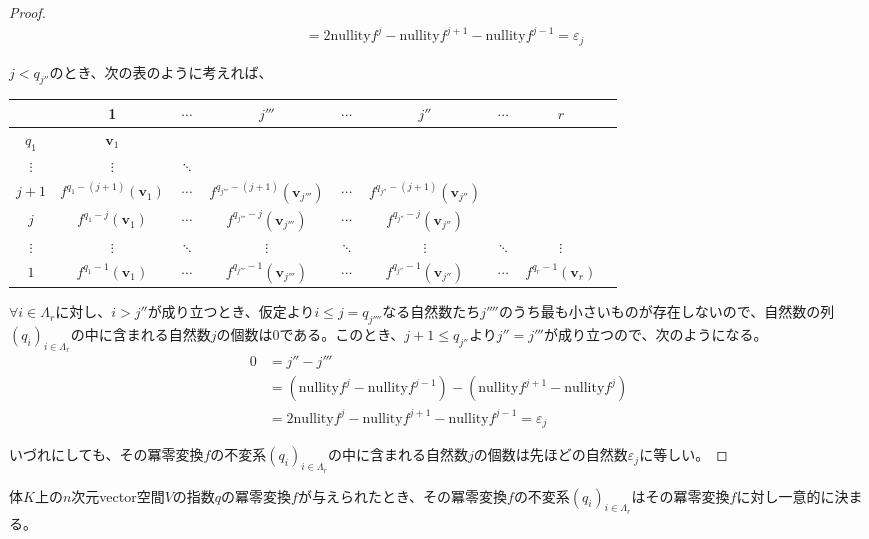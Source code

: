 \documentclass[dvipdfmx]{jsarticle}
\begin{document}
\begin{proof}
\begin{align*}
&= 2{\mathrm{nullity}}f^{j} - {\mathrm{nullity}}f^{j + 1} - {\mathrm{nullity}}f^{j - 1} = \varepsilon_{j}
\end{align*}\par
$j < q_{j''}$のとき、次の表のように考えれば、
\begin{longtable}[c]{c|cccccccc}
&1&$\cdots$&$j'''$&$\cdots$&$j''$&$\cdots$&$r$ \\
\hline
$q_{1}$ & $\mathbf{v}_{1}$ & & & & & & \\
$\vdots$ & $\vdots$ & $\ddots$ & & & & & \\
$j + 1$ & $f^{q_{1} - (j + 1)}\left( \mathbf{v}_{1} \right)$ &
$\cdots$ &
$f^{q_{j'''} - (j + 1)}\left( \mathbf{v}_{j'''} \right)$ &
$\cdots$ &
$f^{q_{j''} - (j + 1)}\left( \mathbf{v}_{j''} \right)$ & & \\
$j$ & $f^{q_{1} - j}\left( \mathbf{v}_{1} \right)$ & $\cdots$ &
$f^{q_{j'''} - j}\left( \mathbf{v}_{j'''} \right)$ & $\cdots$
& $f^{q_{j''} - j}\left( \mathbf{v}_{j''} \right)$ & & \\
$\vdots$ & $\vdots$ & $\ddots$ & $\vdots$ & $\ddots$ &
$\vdots$ & $\ddots$ & $\vdots$ \\
$1$ & $f^{q_{1} - 1}\left( \mathbf{v}_{1} \right)$ & $\cdots$ &
$f^{q_{j'''} - 1}\left( \mathbf{v}_{j'''} \right)$ & $\cdots$
& $f^{q_{j''} - 1}\left( \mathbf{v}_{j''} \right)$ & $\cdots$
& $f^{q_{r} - 1}\left( \mathbf{v}_{r} \right)$ \\
\end{longtable}
$\forall i \in \varLambda_{r}$に対し、$i > j''$が成り立つとき、仮定より$i \leq j = q_{j''''}$なる自然数たち$j''''$のうち最も小さいものが存在しないので、自然数の列$\left( q_{i} \right)_{i \in \varLambda_{r}}$の中に含まれる自然数$j$の個数は$0$である。このとき、$j + 1 \leq q_{j''}$より$j'' = j'''$が成り立つので、次のようになる。
\begin{align*}
0 &= j'' - j'''\\
&= \left( {\mathrm{nullity}}f^{j} - {\mathrm{nullity}}f^{j - 1} \right) - \left( {\mathrm{nullity}}f^{j + 1} - {\mathrm{nullity}}f^{j} \right)\\
&= 2{\mathrm{nullity}}f^{j} - {\mathrm{nullity}}f^{j + 1} - {\mathrm{nullity}}f^{j - 1} = \varepsilon_{j}
\end{align*}\par
いづれにしても、その冪零変換$f$の不変系$\left( q_{i} \right)_{i \in \varLambda_{r}}$の中に含まれる自然数$j$の個数は先ほどの自然数$\varepsilon_{j}$に等しい。
\end{proof}
\begin{thm}[冪零変換の不変系の一意性]\label{2.2.5.6}
体$K$上の$n$次元vector空間$V$の指数$q$の冪零変換$f$が与えられたとき、その冪零変換$f$の不変系$\left( q_{i} \right)_{i \in \varLambda_{r}}$はその冪零変換$f$に対し一意的に決まる。
\end{thm}
\end{document}
